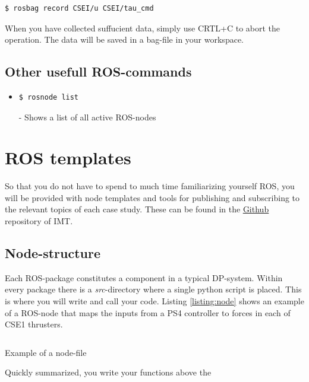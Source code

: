 \documentclass{ol-softwaremanual}
\begin{document}
\begin{lstlisting}[language=bash,basicstyle=\mlttfamily, breaklines=true]
  $ rosbag record CSEI/u CSEI/tau_cmd
\end{lstlisting}

When you have collected suffucient data, simply use CRTL+C to abort the operation. The data will be saved in a bag-file in your workspace.

\subsection{Other usefull ROS-commands}
\begin{itemize}
    \item \begin{lstlisting}[language=bash,basicstyle=\mlttfamily, breaklines=true]
  $ rosnode list
  \end{lstlisting} -
    Shows a list of all active ROS-nodes
\end{itemize}

\section{ROS templates}

So that you do not have to spend to much time familiarizing yourself ROS, you will be provided with node templates and tools for publishing and subscribing to the relevant topics of each case study. These can be found in the \underline{\href{https://github.com/NTNU-MCS/CS_EnterpriseI/tree/master/ROS1/DP-Lab}{Github}} repository of IMT.

\subsection{Node-structure}

Each ROS-package constitutes a component in a typical DP-system. Within every package there is a \textit{src}-directory where a single python script is placed. This is where you will write and call your code. Listing \ref{listing:node} shows an example of a ROS-node that maps the inputs from a PS4 controller to forces in each of CSE1 thrusters. 

\begin{listing}[h]
\inputminted{python}{code/feedback_ctrl.py}
\caption{Example of a node-file}
\label{listing:node}
\end{listing}

Quickly summarized, you write your functions above the 
\end{document}
